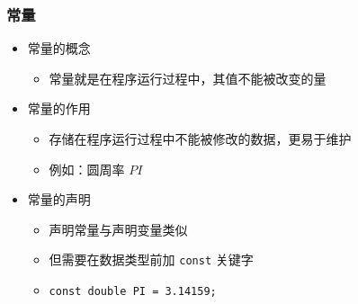 \begin{frame}[fragile]
    \frametitle{常量}

    \begin{itemize}
        \item<1-> 常量的概念

            \begin{itemize}
                \item 常量就是在程序运行过程中，其值不能被改变的量
            \end{itemize}

        \item<2-> 常量的作用

            \begin{itemize}
                \item 存储在程序运行过程中不能被修改的数据，更易于维护
                \item 例如：圆周率 $PI$
            \end{itemize}

        \item<3-> 常量的声明

            \begin{itemize}
                \item 声明常量与声明变量类似
                \item 但需要在数据类型前加 \lstinline|const| 关键字
                \item \lstinline|const double PI = 3.14159;|
            \end{itemize}

    \end{itemize}
\end{frame}

